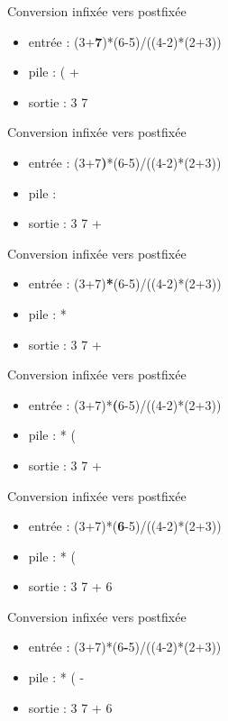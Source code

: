 \documentclass[12pt,a4paper]{beamer}
\begin{document}
\begin{frame}{Conversion infixée vers postfixée}
\begin{itemize}
\item entrée : (3+\textbf{7})*(6-5)/((4-2)*(2+3))
\item pile : ( + 
\item sortie : 3 7 
\end{itemize}
\end{frame}

\begin{frame}{Conversion infixée vers postfixée}
\begin{itemize}
\item entrée : (3+7\textbf{)}*(6-5)/((4-2)*(2+3))
\item pile :  
\item sortie : 3 7 +
\end{itemize}
\end{frame}

\begin{frame}{Conversion infixée vers postfixée}
\begin{itemize}
\item entrée : (3+7)\textbf{*}(6-5)/((4-2)*(2+3))
\item pile : *
\item sortie : 3 7 +
\end{itemize}
\end{frame}

\begin{frame}{Conversion infixée vers postfixée}
\begin{itemize}
\item entrée : (3+7)*\textbf{(}6-5)/((4-2)*(2+3))
\item pile : * (
\item sortie : 3 7 +
\end{itemize}
\end{frame}

\begin{frame}{Conversion infixée vers postfixée}
\begin{itemize}
\item entrée : (3+7)*(\textbf{6}-5)/((4-2)*(2+3))
\item pile : * (
\item sortie : 3 7 + 6
\end{itemize}
\end{frame}

\begin{frame}{Conversion infixée vers postfixée}
\begin{itemize}
\item entrée : (3+7)*(6\textbf{-}5)/((4-2)*(2+3))
\item pile : * ( -
\item sortie : 3 7 + 6
\end{itemize}
\end{frame}
\end{document}
